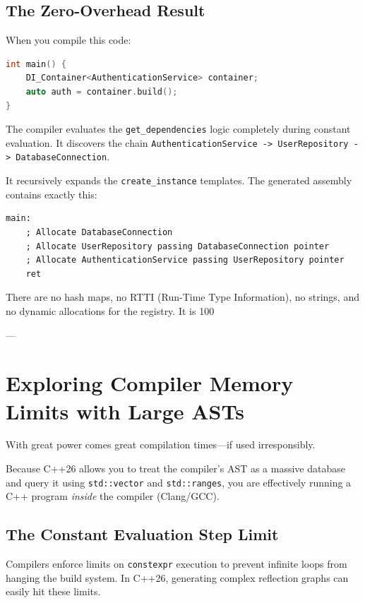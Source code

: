 \subsection{The Zero-Overhead Result}

When you compile this code:

\begin{lstlisting}[language=C++]
int main() {
    DI_Container<AuthenticationService> container;
    auto auth = container.build();
}
\end{lstlisting}

The compiler evaluates the \texttt{get_dependencies} logic completely during constant evaluation. It discovers the chain \texttt{AuthenticationService -> UserRepository -> DatabaseConnection}.

It recursively expands the \texttt{create_instance} templates. The generated assembly contains exactly this:

\begin{lstlisting}[language={[x86masm]Assembler}]
main:
    ; Allocate DatabaseConnection
    ; Allocate UserRepository passing DatabaseConnection pointer
    ; Allocate AuthenticationService passing UserRepository pointer
    ret
\end{lstlisting}

There are no hash maps, no RTTI (Run-Time Type Information), no strings, and no dynamic allocations for the registry. It is 100%

---

\section{Exploring Compiler Memory Limits with Large ASTs}

With great power comes great compilation times—if used irresponsibly. 

Because C++26 allows you to treat the compiler's AST as a massive database and query it using \texttt{std::vector} and \texttt{std::ranges}, you are effectively running a C++ program \textit{inside} the compiler (Clang/GCC).

\subsection{The Constant Evaluation Step Limit}

Compilers enforce limits on \texttt{constexpr} execution to prevent infinite loops from hanging the build system. In C++26, generating complex reflection graphs can easily hit these limits.

